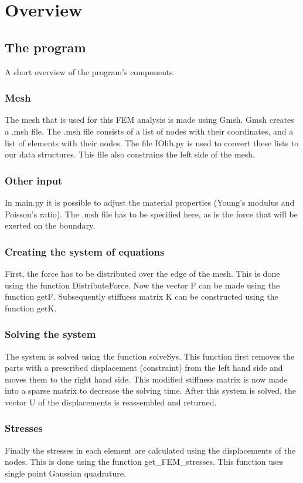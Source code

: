 \chapter{Overview}

\section{The program}
A short overview of the program's components.

\subsection{Mesh}
The mesh that is used for this FEM analysis is made using Gmsh. Gmsh creates a .msh file. The .msh file consists of a list of nodes with their coordinates, and a list of elements with their nodes. The file IOlib.py is used to convert these lists to our data structures. This file also constrains the left side of the mesh. 
\subsection{Other input}
In main.py it is possible to adjust the material properties (Young's modulus and Poisson's ratio). The .msh file has to be specified here, as is the force that will be exerted on the boundary. 
\subsection{Creating the system of equations}
First, the force has to be distributed over the edge of the mesh. This is done using the function Distribute\textunderscore Force. Now the vector F can be made using the function getF. Subsequently stiffness matrix K can be constructed using the function getK. 
\subsection{Solving the system}
The system is solved using the function solveSys. This function first removes the parts with a prescribed displacement (constraint) from the left hand side and moves them to the right hand side. This modified stiffness matrix is now made into a sparse matrix to decrease the solving time. After this system is solved, the vector U of the displacements is reassembled and returned. 
\subsection{Stresses}
Finally the stresses in each element are calculated using the displacements of the nodes. This is done using the function get\_FEM\_stresses. This function uses single point Gaussian quadrature.

